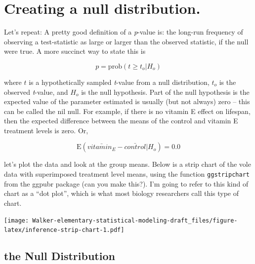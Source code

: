 \documentclass[]{book}
\begin{document}
\section{Creating a null
distribution.}\label{creating-a-null-distribution.}

Let's repeat: A pretty good definition of a \emph{p}-value is: the
long-run frequency of observing a test-statistic as large or larger than
the observed statistic, if the null were true. A more succinct way to
state this is

\begin{equation}
p = \mathrm{prob}(t \ge t_o | H_o)
\end{equation}

where \(t\) is a hypothetically sampled \emph{t}-value from a null
distribution, \(t_o\) is the observed \emph{t}-value, and \(H_o\) is the
null hypothesis. Part of the null hypothesis is the expected value of
the parameter estimated is usually (but not always) zero -- this can be
called the nil null. For example, if there is no vitamin E effect on
lifespan, then the expected difference between the means of the control
and vitamin E treatment levels is zero. Or,

\begin{equation}
\mathrm{E}(\bar{vitamin_E} - \bar{control} | H_o) = 0.0
\end{equation}

let's plot the data and look at the group means. Below is a strip chart
of the vole data with superimposed treatment level means, using the
function \texttt{ggstripchart} from the ggpubr package (can you make
this?). I'm going to refer to this kind of chart as a ``dot plot'',
which is what most biology researchers call this type of chart.

\texttt{[image: Walker-elementary-statistical-modeling-draft\_files/figure-latex/inference-strip-chart-1.pdf]}

\subsection{the Null Distribution}\label{the-null-distribution}
\end{document}
